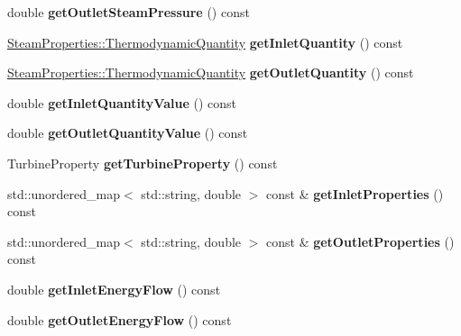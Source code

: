 \begin{DoxyCompactItemize}
\item 
\mbox{\label{class_turbine_a1589b2364a553db7aaa875bb543d171d}} 
double {\bfseries get\+Outlet\+Steam\+Pressure} () const
\item 
\mbox{\label{class_turbine_ac9e91d9539cea5cd1e0037c397c28c78}} 
\hyperlink{class_steam_properties_ae0294bedf7d178c2d8fb6aed0f62fbff}{Steam\+Properties\+::\+Thermodynamic\+Quantity} {\bfseries get\+Inlet\+Quantity} () const
\item 
\mbox{\label{class_turbine_acd3e98ab67754b652de97498d9bec6d2}} 
\hyperlink{class_steam_properties_ae0294bedf7d178c2d8fb6aed0f62fbff}{Steam\+Properties\+::\+Thermodynamic\+Quantity} {\bfseries get\+Outlet\+Quantity} () const
\item 
\mbox{\label{class_turbine_a3d8a3f317fa71abb3404144371615725}} 
double {\bfseries get\+Inlet\+Quantity\+Value} () const
\item 
\mbox{\label{class_turbine_aca98f128213e02e95dfd6f4b2ad8de4e}} 
double {\bfseries get\+Outlet\+Quantity\+Value} () const
\item 
\mbox{\label{class_turbine_a14f6eff49b501aa8c5a22d404dbeaac0}} 
Turbine\+Property {\bfseries get\+Turbine\+Property} () const
\item 
\mbox{\label{class_turbine_a575f5527de69f57d4f344f3c66ee898d}} 
std\+::unordered\+\_\+map$<$ std\+::string, double $>$ const  \& {\bfseries get\+Inlet\+Properties} () const
\item 
\mbox{\label{class_turbine_ae6ac54bac33feff9d06800acdefacf9d}} 
std\+::unordered\+\_\+map$<$ std\+::string, double $>$ const  \& {\bfseries get\+Outlet\+Properties} () const
\item 
\mbox{\label{class_turbine_ae5d55a7b882e4780d490d43409f8f06c}} 
double {\bfseries get\+Inlet\+Energy\+Flow} () const
\item 
\mbox{\label{class_turbine_aa20c0f9dd81cd9bfd5eda77f588516b5}} 
double {\bfseries get\+Outlet\+Energy\+Flow} () const
\item 

\end{DoxyCompactItemize}

